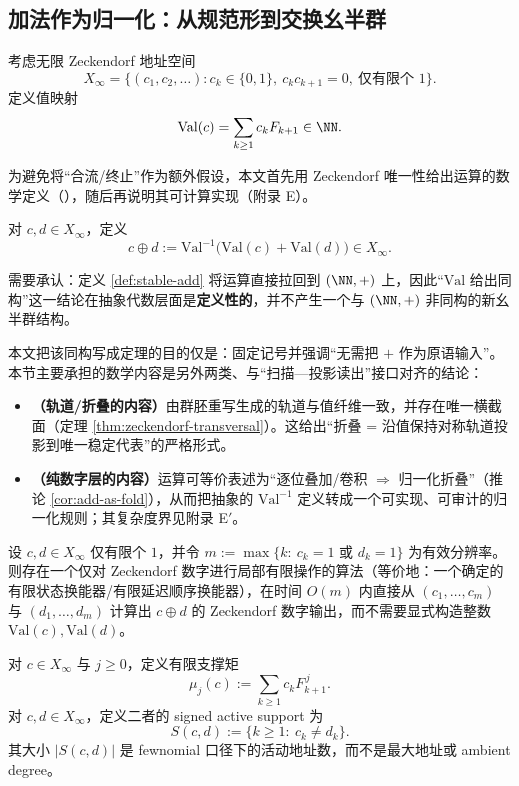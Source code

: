 \subsection{加法作为归一化：从规范形到交换幺半群}\label{subsec:emergent-arithmetic-stable-add}

考虑无限 Zeckendorf 地址空间
\[
X_\infty=\{(c_1,c_2,\dots): c_k\in\{0,1\},\ c_kc_{k+1}=0,\ \text{仅有限个 }1\}.
\]
定义值映射
\[
\mathrm{Val}(c)=\sum_{k\ge1}c_kF_{k+1}\in\NN.
\]

为避免将“合流/终止”作为额外假设，本文首先用 Zeckendorf 唯一性给出运算的数学定义（\cite{Zeckendorf1972}），随后再说明其可计算实现（附录 E）。

\begin{definition}[稳定加法]\label{def:stable-add}
对 $c,d\in X_\infty$，定义
\[
c\oplus d:=\mathrm{Val}^{-1}\bigl(\mathrm{Val}(c)+\mathrm{Val}(d)\bigr)\in X_\infty.
\]
\end{definition}

\begin{remark}\label{rem:arith-not-novel-as-abstract}
需要承认：定义 \ref{def:stable-add} 将运算直接拉回到 $(\NN,+)$ 上，因此“\(\mathrm{Val}\) 给出同构”这一结论在抽象代数层面是\textbf{定义性的}，并不产生一个与 \((\NN,+)\) 非同构的新幺半群结构。

本文把该同构写成定理的目的仅是：固定记号并强调“无需把 \(+\) 作为原语输入”。本节主要承担的数学内容是另外两类、与“扫描—投影读出”接口对齐的结论：
\begin{itemize}
  \item \textbf{（轨道/折叠的内容）}由群胚重写生成的轨道与值纤维一致，并存在唯一横截面（定理 \ref{thm:zeckendorf-transversal}）。这给出“折叠 = 沿值保持对称轨道投影到唯一稳定代表”的严格形式。
  \item \textbf{（纯数字层的内容）}运算可等价表述为“逐位叠加/卷积 $\Rightarrow$ 归一化折叠”（推论 \ref{cor:add-as-fold}），从而把抽象的 \(\mathrm{Val}^{-1}\) 定义转成一个可实现、可审计的归一化规则；其复杂度界见附录 E$'$。
\end{itemize}
\end{remark}

\begin{theorem}\label{thm:zeckendorf-add-fst}
设 $c,d\in X_\infty$ 仅有限个 $1$，并令
\(
m:=\max\{k:\ c_k=1\text{ 或 }d_k=1\}
\)
为有效分辨率。则存在一个仅对 Zeckendorf 数字进行局部有限操作的算法（等价地：一个确定的有限状态换能器/有限延迟顺序换能器），在时间 $O(m)$ 内直接从 $(c_1,\dots,c_m)$ 与 $(d_1,\dots,d_m)$ 计算出 $c\oplus d$ 的 Zeckendorf 数字输出，而不需要显式构造整数 $\mathrm{Val}(c),\mathrm{Val}(d)$。
\end{theorem}
\begin{definition}\label{def:distill-khovanskii-active-address-moments}
对 \(c\in X_\infty\) 与 \(j\ge0\)，定义有限支撑矩
\[
\mu_j(c):=\sum_{k\ge1}c_kF_{k+1}^{\,j}.
\]
对 \(c,d\in X_\infty\)，定义二者的 signed active support 为
\[
S(c,d):=\{k\ge1:\ c_k\ne d_k\}.
\]
其大小 \(|S(c,d)|\) 是 fewnomial 口径下的活动地址数，而不是最大地址或 ambient degree。
\end{definition}

